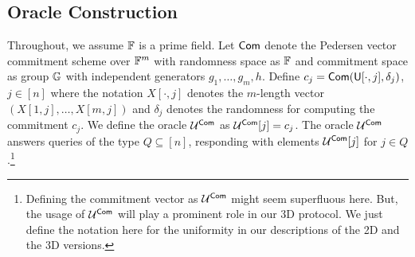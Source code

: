\subsection{Oracle Construction}\label{subsec: commit2D}
Throughout, we assume $\mathbb{F}$ is a prime field. Let $\mathsf{Com}$ denote the Pedersen vector commitment scheme over $\mathbb{F}^m$ with randomness space as $\mathbb{F}$ and commitment space as group $\mathbb{G}$ with independent generators $g_1,\ldots,g_m, h$. Define $c_{j} = \mathsf{Com}(\mathsf{U}[\cdot,j],\delta_{j})$, $j\in [n]$ where the notation $X[\cdot,j]$ denotes the $m$-length vector $(X[1,j],\ldots,X[m,j])$ and $\delta_{j}$ denotes the randomness for computing the commitment $c_{j}$. We define the oracle $\mathcal{U}^{\mathsf{Com}}$ as $\mathcal{U}^{\mathsf{Com}}[j]=c_{j}$. The oracle $\mathcal{U}^{\mathsf{Com}}$ answers queries of the type $Q\subseteq [n]$, responding with elements $\mathcal{U}^{\mathsf{Com}}[j]$ for $j\in Q$.\footnote{Defining the commitment vector as $\mathcal{U}^{\mathsf{Com}}$ might seem superfluous here. But, the usage of $\mathcal{U}^{\mathsf{Com}}$ will play a prominent role in our 3D protocol. We just define the notation here for the uniformity in our descriptions of the 2D and the 3D versions.} 
